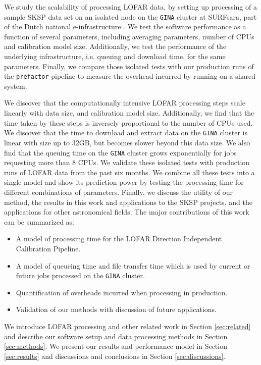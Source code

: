 We study the scalability of processing LOFAR data, by setting up processing of a sample SKSP data set on an isolated node on the \texttt{GINA} cluster at SURFsara, part of the Dutch national e-infrastructure \citep{dutch_einfra}. We test the software performance as a function of several parameters, including averaging parameters, number of CPUs and calibration model size. Additionally, we test the performance of the underlying infrastructure, i.e. queuing  and download time, for the same parameters. Finally, we compare those isolated tests with our production runs of the \texttt{prefactor} pipeline to measure the overhead incurred by running on a shared system. 

We discover that the computationally intensive LOFAR processing steps scale linearly with data size, and calibration model size. Additionally, we find that the time taken by these steps is inversely proportional to the number of CPUs used. We discover that the time to download and extract data on the \texttt{GINA} cluster is linear with size up to 32GB, but becomes slower beyond this data size. We also find that the queuing time on the \texttt{GINA} cluster grows exponentially for jobs requesting more than 8 CPUs. We validate these isolated tests with production runs of LOFAR data from the past six months. We combine all these tests into a single model and show its prediction power by testing the processing time for different combinations of parameters. Finally, we discuss the utility of our method, the results in this work and applications to the SKSP projects, and the applications for other astronomical fields. The major contributions of this work can be summarized as:

\begin{itemize}
    \item A model of processing time for the  LOFAR Direction Independent Calibration Pipeline.
    \item A model of queueing time and file transfer time which is used by current or future jobs processed on the \texttt{GINA} cluster.
    \item Quantification of overheads incurred when processing in production. 
    \item Validation of our methods with discussion of future applications. 
\end{itemize}

We introduce LOFAR processing and other related work in Section \ref{sec:related} and describe our software setup and data processing methods in Section \ref{sec:methods}. We present our results and performance model in Section \ref{sec:results} and discussions and conclusions in Section \ref{sec:discussions}. 

